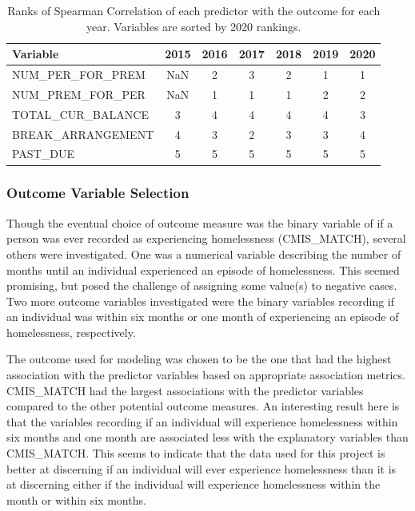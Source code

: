 \documentclass[10pt,letterpaper]{article}
\begin{document}
\begin{table}[!h]
    \centering
    \begin{tabular}{lcccccc}
        \toprule
                 Variable &  2015 &  2016 &  2017 &  2018 &  2019 &  2020 \\
        \midrule
         NUM\_PER\_FOR\_PREM &   NaN &     2 &     3 &     2 &     1 &     1 \\
         NUM\_PREM\_FOR\_PER &   NaN &     1 &     1 &     1 &     2 &     2 \\
        TOTAL\_CUR\_BALANCE &     3 &     4 &     4 &     4 &     4 &     3 \\
        BREAK\_ARRANGEMENT &     4 &     3 &     2 &     3 &     3 &     4 \\
                 PAST\_DUE &     5 &     5 &     5 &     5 &     5 &     5 \\
        \bottomrule
    \end{tabular}
\caption{Ranks of Spearman Correlation of each predictor with the outcome for each year. Variables are sorted by 2020 rankings.}
\label{tbl:corr_years}
\end{table}

\subsubsection*{Outcome Variable Selection}
Though the eventual choice of outcome measure was the binary variable of if a person was ever recorded as experiencing homelessness (CMIS\_MATCH), several others were investigated. One was a numerical variable describing the number of months until an individual experienced an episode of homelessness. This seemed promising, but posed the challenge of assigning some value(s) to negative cases. Two more outcome variables investigated were the binary variables recording if an individual was within six months or one month of experiencing an episode of homelessness, respectively. 

The outcome used for modeling was chosen to be the one that had the highest association with the predictor variables based on appropriate association metrics. CMIS\_MATCH had the largest associations with the predictor variables compared to the other potential outcome measures. An interesting result here is that the variables recording if an individual will experience homelessness within six months and one month are associated less with the explanatory variables than CMIS\_MATCH. This seems to indicate that the data used for this project is better at discerning if an individual will ever experience homelessness than it is at discerning either if the individual will experience homelessness within the month or within six months.
\end{document}
